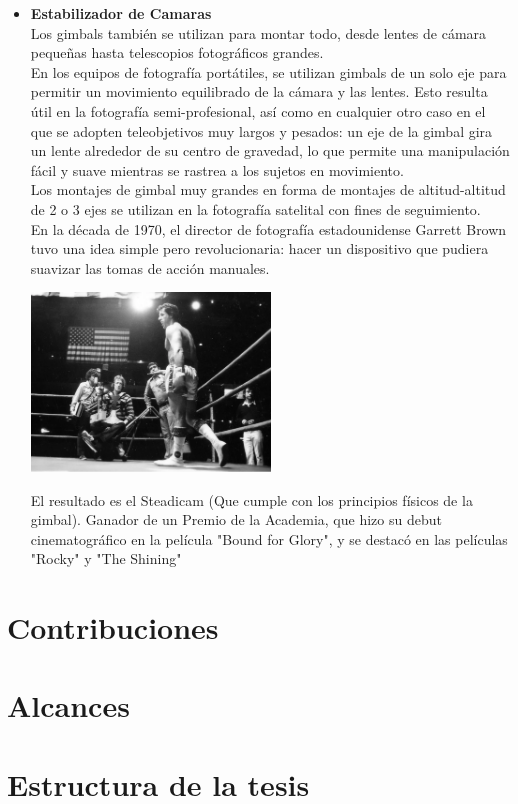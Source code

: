 \begin{itemize}
	\item \textbf{Estabilizador de Camaras}\\
	      Los gimbals también se utilizan para montar todo, desde lentes de cámara pequeñas
	      hasta telescopios fotográficos grandes.\\
	      En los equipos de fotografía portátiles, se utilizan gimbals de un
	      solo eje para permitir un movimiento equilibrado de la cámara y las lentes.
	      Esto resulta útil en la fotografía semi-profesional, así como en cualquier otro
	      caso en el que se adopten teleobjetivos muy largos y pesados: un eje de la gimbal
	      gira un lente alrededor de su centro de gravedad, lo que permite una manipulación
	      fácil y suave mientras se rastrea a los sujetos en movimiento.\\
	      Los montajes de gimbal muy grandes en forma de montajes de altitud-altitud de 2 o 3 ejes
	      se utilizan en la fotografía satelital con fines de seguimiento.\\
	      En la década de 1970, el director de fotografía estadounidense Garrett Brown tuvo
	      una idea simple pero revolucionaria: hacer un dispositivo que pudiera suavizar las
	      tomas de acción manuales.
	      \begin{center}
		      \includegraphics[width=0.5\textwidth]{Contenido/Cuerpo/Capitulo1/Fig4.eps}
		      \label{fig:Introduccion:Fig5}
	      \end{center}

	      El resultado es el Steadicam (Que cumple con los principios físicos de la gimbal).
	      Ganador de un Premio de la Academia, que hizo su debut cinematográfico en la
	      película "Bound for Glory", y se destacó en las películas "Rocky" y "The Shining"


\end{itemize}

\section{Contribuciones}

\section{Alcances}


\section{Estructura de la tesis}